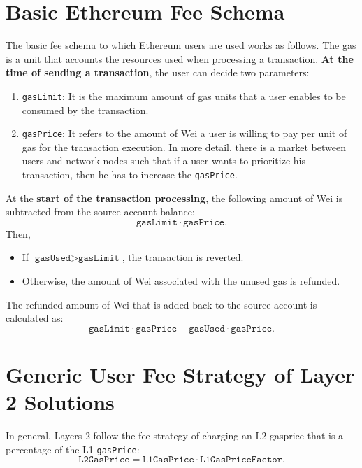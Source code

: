 


\section{Basic Ethereum Fee Schema}

The basic fee schema to which Ethereum users are used works as follows. The gas is a unit that accounts the resources used when processing a transaction. \textbf{At the time of sending a transaction}, the user can decide two parameters:

\begin{enumerate}
\item \texttt{gasLimit}: It is the maximum amount of gas units that a user enables to be consumed by the transaction.

\item \texttt{gasPrice}: It refers to the amount of Wei a user is willing to pay per unit of gas for the transaction execution. In more detail, there is a market between users and network nodes such that if a user wants to prioritize his transaction, then he has to increase the \texttt{gasPrice}.
\end{enumerate}



At the \textbf{start of the transaction processing}, the following
amount of Wei is subtracted from the source account balance:
\[
\texttt{gasLimit} \cdot \texttt{gasPrice}.
\]
Then,
\begin{itemize}
\item If $\texttt{gasUsed} > \texttt{gasLimit}$, the transaction is reverted.
\item Otherwise, the amount of Wei associated with the unused gas is refunded.
\end{itemize}
The refunded amount of Wei that is added back to the source account is calculated as:
\[
\texttt{gasLimit} \cdot \texttt{gasPrice} - \texttt{gasUsed} \cdot \texttt{gasPrice}.
\]



\section{Generic User Fee Strategy of Layer 2 Solutions}

In general, Layers 2 follow the fee strategy of charging an L2 gasprice that is a percentage of the L1 \texttt{gasPrice}:
\[
\texttt{L2GasPrice} = \texttt{L1GasPrice} \cdot \texttt{L1GasPriceFactor}.
\]

